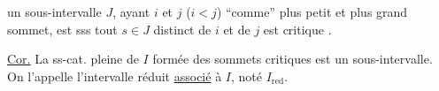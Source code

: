   

 un sous-intervalle $J$, ayant $i$ et $j$ ($i<j$) ``comme'' plus petit et plus grand sommet, est   sss  tout  $s\in J$ distinct de $i$ et de $j$ est critique .

\uline{Cor.} La ss-cat. pleine de $I$ formée des sommets critiques est un sous-intervalle. On l'appelle l'intervalle réduit \uline{associé} à $I$, noté $I_{\mathrm{red}}$.

